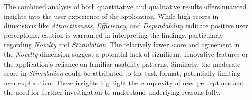 The combined analysis of both quantitative and qualitative results offers nuanced insights into the user experience of the application. 
While high scores in dimensions like \emph{Attractiveness}, \emph{Efficiency}, and \emph{Dependability} indicate positive user perceptions, caution is warranted in interpreting the findings, particularly regarding \emph{Novelty} and \emph{Stimulation}. 
The relatively lower score and agreement in the \emph{Novelty} dimension suggest a potential lack of significant innovative features or the application's reliance on familiar usability patterns. 
Similarly, the moderate score in \emph{Stimulation} could be attributed to the task format, potentially limiting user exploration. 
These insights highlight the complexity of user perceptions and the need for further investigation to understand underlying reasons fully.
